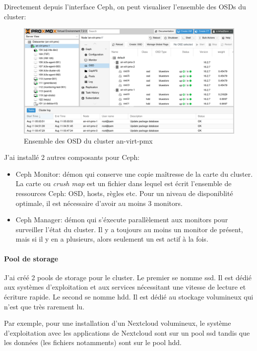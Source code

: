 \documentclass[12pt]{article}
\begin{document}
Directement depuis l'interface Ceph, on peut visualiser l'ensemble des OSDs du cluster:
\begin{figure}
    \centering
        \includegraphics[width=\textwidth]{src/osd_cluster.png}
    \caption{Ensemble des OSD du cluster an-virt-pmx}
    \label{fig:osd_cluster}
\end{figure}

J'ai installé 2 autres composants pour Ceph:
\begin{itemize}
    \item Ceph Monitor: démon qui conserve une copie maîtresse de la carte du cluster. 
    La carte ou \textit{crush map} est un fichier dans lequel est écrit l'ensemble de ressources Ceph: OSD, hosts, règles etc.
    Pour un niveau de disponiblité optimale, il est nécessaire d'avoir au moins 3 monitors.
    \item Ceph Manager: démon qui s'éxecute parallèlement aux monitors pour surveiller l'état du cluster.
    Il y a toujours au moins un monitor de présent, mais si il y en a plusieurs, alors seulement un est actif à la fois.
\end{itemize}

\paragraph{Pool de storage}
J'ai créé 2 pools de storage pour le cluster.
Le premier se nomme ssd. 
Il est dédié aux systèmes d'exploitation et aux services nécessitant une vitesse de lecture et écriture rapide.
Le second se nomme hdd.
Il est dédié au stockage volumineux qui n'est que très rarement lu.

Par exemple, pour une installation d'un Nextcloud volumineux, le système d'exploitation avec les applications de Nextcloud sont sur un pool ssd tandis que les données (les fichiers notamments) sont sur le pool hdd.
\end{document}
